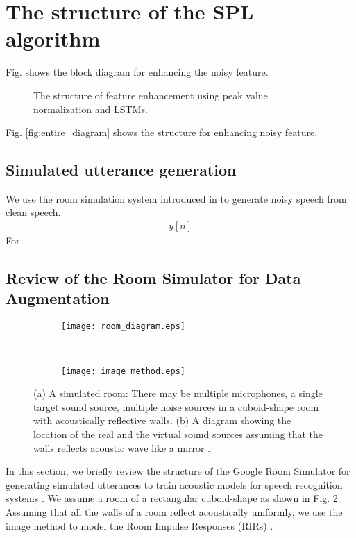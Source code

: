 \documentclass{article}
\begin{document}
\section{The structure of the SPL algorithm}

Fig. \label{fig:entire_diagram} shows the block diagram for
enhancing the noisy feature.

\begin{figure}
    \centering
    \resizebox{80mm}{!}{%
         } %
    \caption {
      The structure of feature enhancement using peak
      value normalization and LSTMs.
      \label{fig:entire_diagam}
    }
\end{figure}

Fig. \ref{fig:entire_diagram} shows the structure for enhancing
noisy feature.

\subsection{Simulated utterance generation}
We use the room simulation system introduced in
\cite{C_Kim_INTERSPEECH_2017_1} to generate noisy speech
from clean speech.
\begin{align}
  y[n]
\end{align}
For 
\subsection{Review of the Room Simulator for Data Augmentation}
%
%
\begin{figure}
  \centering
    \begin{subfigure}{\linewidth}
      \centering
      \texttt{[image: room\_diagram.eps]}
      \caption{}
      \label{fig:room_diagram}
    \end{subfigure}
   \\
    \begin{subfigure}{\linewidth}
      \centering
      \texttt{[image: image\_method.eps]}
      \caption{}
      \label{fig:image_method}
    \end{subfigure}
    \caption{
    (a) A simulated room: There may be multiple microphones, a single target
    sound source, multiple noise sources in a cuboid-shape room with
    acoustically reflective walls. (b) A diagram showing the location
    of the real and the virtual sound sources assuming that the walls
    reflects acoustic wave like a mirror \cite{C_Kim_INTERSPEECH_2017_1}.}
  \vspace{-10mm}
\end{figure}
%
%
In this section, we briefly review the structure of the Google
Room Simulator for generating simulated utterances
to train acoustic models for speech recognition systems
\cite{C_Kim_INTERSPEECH_2017_1}. We assume a room of a
rectangular cuboid-shape as shown in Fig. \ref{fig:room_diagram}.
Assuming that all the walls of a room reflect acoustically uniformly,
we use the image method to model the Room Impulse Responses (RIRs)
\cite{J_Allen_JASA_1979, E_A_Lehmann_ASPAA_2007, S_G_McGovern_RIR}.
\end{document}
